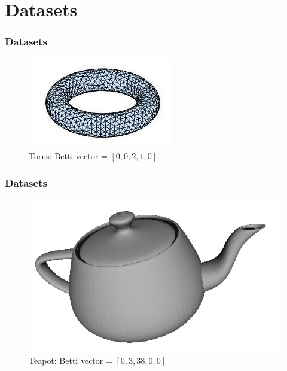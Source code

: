 \documentclass{beamer}
\begin{document}
\section{Datasets}
\begin{frame}
\frametitle{Datasets}
\begin{figure}
\center
\includegraphics[scale=0.5]{torus.jpg}
\caption{Torus: Betti vector = $[0,0,2,1,0]$}
\end{figure}
\end{frame}

\begin{frame}
\frametitle{Datasets}
\begin{figure}
\center
\includegraphics[scale=0.5]{teapot00.png}
\caption{Teapot: Betti vector = $[0,3,38,0,0]$}
\end{figure}
\end{frame}
\end{document}
